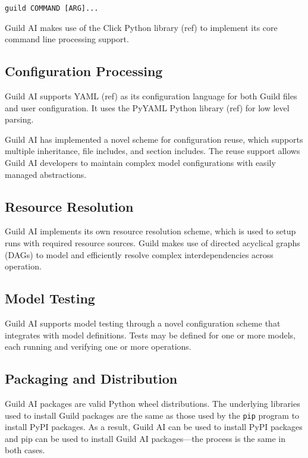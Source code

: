 \documentclass{article}
\begin{document}
{\footnotesize
\begin{verbatim}
guild COMMAND [ARG]...
\end{verbatim}}

Guild AI makes use of the Click Python library (ref) to implement its
core command line processing support.

\subsection{Configuration Processing}

Guild AI supports YAML (ref) as its configuration language for both
Guild files and user configuration. It uses the PyYAML Python library
(ref) for low level parsing.

Guild AI has implemented a novel scheme for configuration reuse, which
supports multiple inheritance, file includes, and section
includes. The reuse support allows Guild AI developers to maintain
complex model configurations with easily managed abstractions.

\subsection{Resource Resolution}

Guild AI implements its own resource resolution scheme, which is used
to setup runs with required resource sources. Guild makes use of
directed acyclical graphs (DAGs) to model and efficiently resolve
complex interdependencies across operation.

\subsection{Model Testing}

Guild AI supports model testing through a novel configuration scheme
that integrates with model definitions. Tests may be defined for one
or more models, each running and verifying one or more operations.

\subsection{Packaging and Distribution}

Guild AI packages are valid Python wheel distributions. The underlying
libraries used to install Guild packages are the same as those used by
the \verb|pip| program to install PyPI packages. As a result, Guild
AI can be used to install PyPI packages and pip can be used to install
Guild AI packages---the process is the same in both cases.
\end{document}
